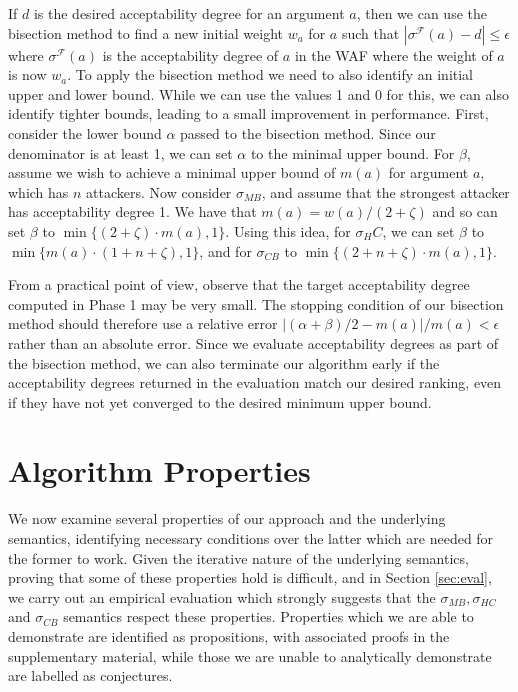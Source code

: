 \documentclass{article}
\newcommand{\AF}{\mathcal{F}}
\begin{document}
If $d$ is the desired acceptability degree for an argument $a$, then we can use the bisection method to find a new initial weight $w_a$ for $a$ such that $|\sigma^\AF(a)-d| \leq \epsilon$ where $\sigma^\AF(a)$ is the acceptability degree of $a$ in the WAF where the weight of $a$ is now $w_a$.
%
To apply the bisection method we need to also identify an initial upper and lower bound. While we can use the values 1 and 0 for this, we can also identify tighter bounds, leading to a small improvement in performance.
%
First, consider the lower bound $\alpha$ passed to the bisection method. Since our denominator is at least 1, we can set $\alpha$ to the minimal upper bound. For $\beta$, assume we wish to achieve a minimal upper bound of $m(a)$ for argument $a$, which has $n$ attackers. 
%
Now consider $\sigma_{MB}$, and assume that the strongest attacker has acceptability degree 1. We have that $m(a)=w(a)/(2+\zeta)$ and so can set $\beta$ to $\min\{(2+\zeta) \cdot m(a),1\}$. Using this idea, for $\sigma_HC$, we can set $\beta$ to $\min\{m(a) \cdot (1+n+\zeta),1\}$, and for $\sigma_{CB}$ to $\min\{(2+n+\zeta) \cdot m(a),1\}$.

From a practical point of view, observe that the target acceptability degree computed in Phase 1 may be very small. The stopping condition of our bisection method should therefore use a relative error $|(\alpha + \beta)/2-m(a)|/m(a)<\epsilon$ rather than an absolute error. Since we evaluate acceptability degrees as part of the bisection method, we can also terminate our algorithm early if the acceptability degrees returned in the evaluation match our desired ranking, even if they have not yet converged to the desired minimum upper bound.

\section{Algorithm Properties}\label{sec:prop}
We now examine several properties of our approach and the underlying semantics, identifying necessary conditions over the latter which are needed for the former to work. Given the iterative nature of the underlying semantics, proving that some of these properties hold is difficult, and in Section \ref{sec:eval}, we carry out an empirical evaluation which strongly suggests that the $\sigma_{MB},\sigma_{HC}$ and $\sigma_{CB}$ semantics respect these properties. Properties which we are able to demonstrate are identified as propositions, with associated proofs in the supplementary material, while those we are unable to analytically demonstrate are labelled as conjectures.
\end{document}
